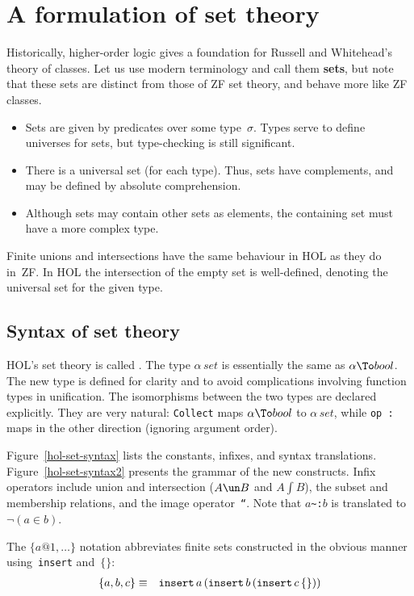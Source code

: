 \section{A formulation of set theory}
Historically, higher-order logic gives a foundation for Russell and
Whitehead's theory of classes.  Let us use modern terminology and call them
{\bf sets}, but note that these sets are distinct from those of ZF set theory,
and behave more like ZF classes.
\begin{itemize}
\item
Sets are given by predicates over some type~$\sigma$.  Types serve to
define universes for sets, but type-checking is still significant.
\item
There is a universal set (for each type).  Thus, sets have complements, and
may be defined by absolute comprehension.
\item
Although sets may contain other sets as elements, the containing set must
have a more complex type.
\end{itemize}
Finite unions and intersections have the same behaviour in HOL as they do
in~ZF.  In HOL the intersection of the empty set is well-defined, denoting the
universal set for the given type.

\subsection{Syntax of set theory}
HOL's set theory is called .  The type $\alpha\,set$ is essentially
the same as $\alpha\To bool$.  The new type is defined for clarity and to
avoid complications involving function types in unification.  The isomorphisms
between the two types are declared explicitly.  They are very natural:
\texttt{Collect} maps $\alpha\To bool$ to $\alpha\,set$, while \hbox{\tt op :}
maps in the other direction (ignoring argument order).

Figure~\ref{hol-set-syntax} lists the constants, infixes, and syntax
translations.  Figure~\ref{hol-set-syntax2} presents the grammar of the new
constructs.  Infix operators include union and intersection ($A\un B$
and $A\int B$), the subset and membership relations, and the image
operator~{\tt``}\@.  Note that $a$\verb|~:|$b$ is translated to
$\lnot(a\in b)$.  

The $\{a@1,\ldots\}$ notation abbreviates finite sets constructed in
the obvious manner using~\texttt{insert} and~$\{\}$:
\begin{eqnarray*}
  \{a, b, c\} & \equiv &
  \texttt{insert} \, a \, ({\tt insert} \, b \, ({\tt insert} \, c \, \{\}))
\end{eqnarray*}


